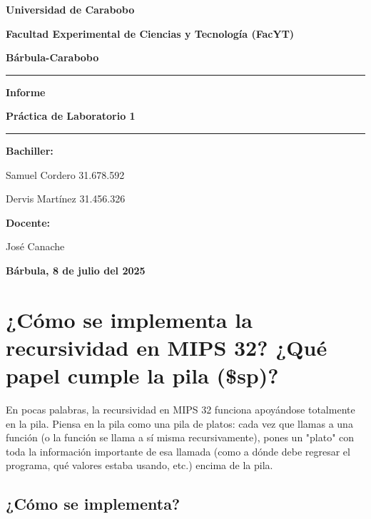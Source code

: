 \documentclass{article}
\begin{document}
\begin{titlepage}
    \centering
    \textbf{\Large Universidad de Carabobo} \par
    \textbf{\Large Facultad Experimental de Ciencias y Tecnología (FacYT)} \par
    \textbf{\Large Bárbula-Carabobo} \par
    \vspace{2cm}
    \hrule \vspace{0.5cm}
    \textbf{\huge Informe} \par
    \textbf{\huge Práctica de Laboratorio 1} \par
    \vspace{0.5cm}
    \hrule \vspace{2cm}
    \begin{flushleft}
        \textbf{Bachiller:} \par
        Samuel Cordero 31.678.592 \par
        Dervis Martínez 31.456.326 \par
    \end{flushleft}
    \begin{flushright}
        \textbf{Docente:} \par
        José Canache \par
    \end{flushright}
    \vfill
    \textbf{Bárbula, 8 de julio del 2025} \par
\end{titlepage}

\clearpage

\section*{¿Cómo se implementa la recursividad en MIPS 32? ¿Qué papel cumple la pila (\$sp)?}

En pocas palabras, la recursividad en MIPS 32 funciona apoyándose totalmente en la pila. Piensa en la pila como una pila de platos: cada vez que llamas a una función (o la función se llama a sí misma recursivamente), pones un "plato" con toda la información importante de esa llamada (como a dónde debe regresar el programa, qué valores estaba usando, etc.) encima de la pila.

\subsection*{¿Cómo se implementa?}
\end{document}
